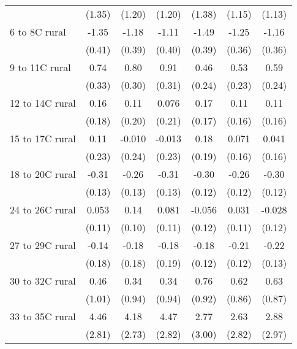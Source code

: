 \documentclass[paper=letterpaper, fontsize=11pt]{article} %
\begin{document}
\begin{longtable}{l*{6}{c}}
                    &      (1.35)&      (1.20)&      (1.20)&      (1.38)&      (1.15)&      (1.13)\\
6 to 8C rural       &       -1.35&       -1.18&       -1.11&       -1.49&       -1.25&       -1.16\\
                    &      (0.41)&      (0.39)&      (0.40)&      (0.39)&      (0.36)&      (0.36)\\
9 to 11C rural      &        0.74&        0.80&        0.91&        0.46&        0.53&        0.59\\
                    &      (0.33)&      (0.30)&      (0.31)&      (0.24)&      (0.23)&      (0.24)\\
12 to 14C rural     &        0.16&        0.11&       0.076&        0.17&        0.11&        0.11\\
                    &      (0.18)&      (0.20)&      (0.21)&      (0.17)&      (0.16)&      (0.16)\\
15 to 17C rural     &        0.11&      -0.010&      -0.013&        0.18&       0.071&       0.041\\
                    &      (0.23)&      (0.24)&      (0.23)&      (0.19)&      (0.16)&      (0.16)\\
18 to 20C rural     &       -0.31&       -0.26&       -0.31&       -0.30&       -0.26&       -0.30\\
                    &      (0.13)&      (0.13)&      (0.13)&      (0.12)&      (0.12)&      (0.12)\\
24 to 26C rural     &       0.053&        0.14&       0.081&      -0.056&       0.031&      -0.028\\
                    &      (0.11)&      (0.10)&      (0.11)&      (0.12)&      (0.11)&      (0.12)\\
27 to 29C rural     &       -0.14&       -0.18&       -0.18&       -0.18&       -0.21&       -0.22\\
                    &      (0.18)&      (0.18)&      (0.19)&      (0.12)&      (0.12)&      (0.13)\\
30 to 32C rural     &        0.46&        0.34&        0.34&        0.76&        0.62&        0.63\\
                    &      (1.01)&      (0.94)&      (0.94)&      (0.92)&      (0.86)&      (0.87)\\
33 to 35C rural     &        4.46&        4.18&        4.47&        2.77&        2.63&        2.88\\
                    &      (2.81)&      (2.73)&      (2.82)&      (3.00)&      (2.82)&      (2.97)\\

\end{longtable}
\end{document}
